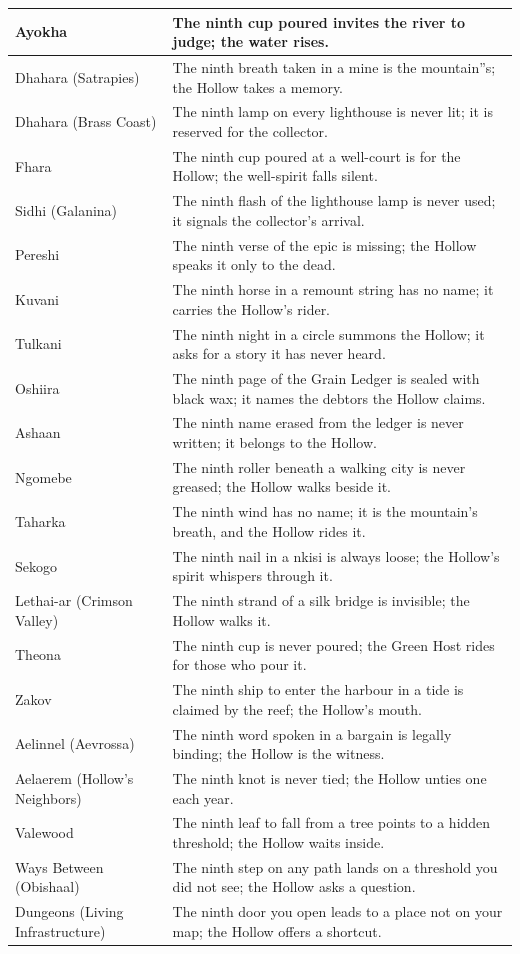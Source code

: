 \documentclass[11pt,letterpaper,twoside]{book}
\begin{document}
\begin{longtable}{|p{}|p{}|}
\hline
Ayokha & The ninth cup poured invites the river to judge; the water rises. \\
\hline
Dhahara (Satrapies) & The ninth breath taken in a mine is the mountain''s; the Hollow takes a memory. \\
\hline
Dhahara (Brass Coast) & The ninth lamp on every lighthouse is never lit; it is reserved for the collector. \\
\hline
Fhara & The ninth cup poured at a well-court is for the Hollow; the well-spirit falls silent. \\
\hline
Sidhi (Galanina) & The ninth flash of the lighthouse lamp is never used; it signals the collector's arrival. \\
\hline
Pereshi & The ninth verse of the epic is missing; the Hollow speaks it only to the dead. \\
\hline
Kuvani & The ninth horse in a remount string has no name; it carries the Hollow's rider. \\
\hline
Tulkani & The ninth night in a circle summons the Hollow; it asks for a story it has never heard. \\
\hline
Oshiira & The ninth page of the Grain Ledger is sealed with black wax; it names the debtors the Hollow claims. \\
\hline
Ashaan & The ninth name erased from the ledger is never written; it belongs to the Hollow. \\
\hline
Ngomebe & The ninth roller beneath a walking city is never greased; the Hollow walks beside it. \\
\hline
Taharka & The ninth wind has no name; it is the mountain's breath, and the Hollow rides it. \\
\hline
Sekogo & The ninth nail in a nkisi is always loose; the Hollow's spirit whispers through it. \\
\hline
Lethai-ar (Crimson Valley) & The ninth strand of a silk bridge is invisible; the Hollow walks it. \\
\hline
Theona & The ninth cup is never poured; the Green Host rides for those who pour it. \\
\hline
Zakov & The ninth ship to enter the harbour in a tide is claimed by the reef; the Hollow's mouth. \\
\hline
Aelinnel (Aevrossa) & The ninth word spoken in a bargain is legally binding; the Hollow is the witness. \\
\hline
Aelaerem (Hollow's Neighbors) & The ninth knot is never tied; the Hollow unties one each year. \\
\hline
Valewood & The ninth leaf to fall from a tree points to a hidden threshold; the Hollow waits inside. \\
\hline
Ways Between (Obishaal) & The ninth step on any path lands on a threshold you did not see; the Hollow asks a question. \\
\hline
Dungeons (Living Infrastructure) & The ninth door you open leads to a place not on your map; the Hollow offers a shortcut. \\
\hline
\end{longtable}
\end{document}
